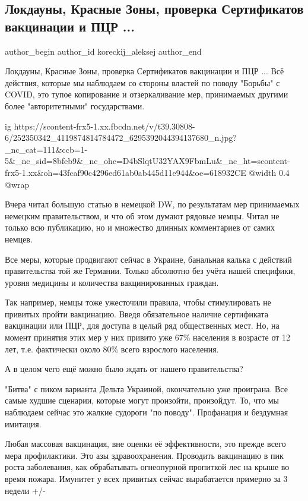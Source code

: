  
 
 
 
 
 
\subsection{Локдауны, Красные Зоны, проверка Сертификатов вакцинации и ПЦР ...}
\label{sec:02_11_2021.fb.koreckij_aleksej.1.covid}
 
\ifcmt
 author_begin
   author_id koreckij_aleksej
 author_end
\fi

Локдауны, Красные Зоны, проверка Сертификатов вакцинации и ПЦР ... Всё
действия, которые мы наблюдаем со стороны властей по поводу "Борьбы" с COVID,
это тупое копирование и отзеркаливание мер, принимаемых другими более
"авторитетными" государствами.

\ifcmt
  ig https://scontent-frx5-1.xx.fbcdn.net/v/t39.30808-6/252350342_4119874814784472_6295392044394137680_n.jpg?_nc_cat=111&ccb=1-5&_nc_sid=8bfeb9&_nc_ohc=D4bSlqtU32YAX9FbmLu&_nc_ht=scontent-frx5-1.xx&oh=43fcaf90c4296ed61ab0ab445d11e944&oe=618932CE
  @width 0.4
  @wrap 
\fi

Вчера читал большую статью в немецкой DW, по результатам мер принимаемых
немецким правительством, и что об этом думают рядовые немцы. Читал не только
всю публикацию, но и множество длинных комментариев от самих немцев.

Все меры, которые продвигают сейчас в Украине, банальная калька с действий
правительства той же Германии. Только абсолютно без учёта нашей специфики,
уровня медицины и количества вакцинированных граждан.

Так например, немцы тоже ужесточили правила, чтобы стимулировать не привитых
пройти вакцинацию. Введя обязательное наличие сертификата вакцинации или ПЦР,
для доступа в целый ряд общественных мест. Но, на момент принятия этих мер у
них привито уже 67\% населения в возрасте от 12 лет, т.е. фактически около 80\%
всего взрослого населения.

А в целом чего ещё можно было ждать от нашего правительства?

"Битва" с пиком варианта Дельта Украиной, окончательно уже проиграна. Все самые
худшие сценарии, которые могут произойти, произойдут. То, что мы наблюдаем
сейчас это жалкие судороги "по поводу". Профанация и бездумная имитация.

Любая массовая вакцинация, вне оценки её эффективности, это прежде всего мера
профилактики. Это азы здравоохранения. Проводить вакцинацию в пик роста
заболевания, как обрабатывать огнеопурной пропиткой лес на крыше во время
пожара. Имунитет у всех привитых сейчас вырабатается примерно за 3 недели +/-

